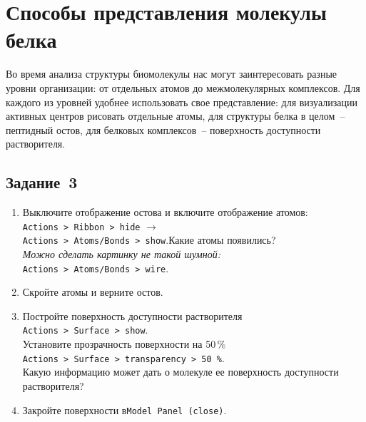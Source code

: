 \section{Способы представления молекулы белка}
Во время анализа структуры биомолекулы нас могут заинтересовать разные уровни
организации: от отдельных атомов до межмолекулярных комплексов. Для каждого из уровней удобнее использовать свое представление:
для визуализации активных центров рисовать отдельные атомы, для структуры белка в целом~-- пептидный остов, для белковых
комплексов~-- поверхность доступности растворителя.

\subsection*{Задание~3}
\begin{enumerate}
    \item Выключите отображение остова и включите отображение атомов:\\\quad\texttt{Actions~> Ribbon~> hide}\quad
    $\rightarrow$\\\quad\texttt{Actions~> Atoms/Bonds~> show}.\quad Какие атомы появились? \\
    \textit{Можно сделать картинку не такой шумной:}\\\quad\texttt{Actions~> Atoms/Bonds~> wire}.
    \item Скройте атомы и верните остов.
    \item Постройте поверхность доступности растворителя\\\quad\texttt{Actions~> Surface~> show}.\quad\\ Установите прозрачность поверхности на 50\,\%\\
    \quad\texttt{Actions~> Surface~> transparency~> 50\,\%}.\quad\\Какую информацию может дать о молекуле ее поверхность доступности растворителя?
    \item Закройте поверхности в\quad\texttt{Model Panel (close)}.
\end{enumerate}